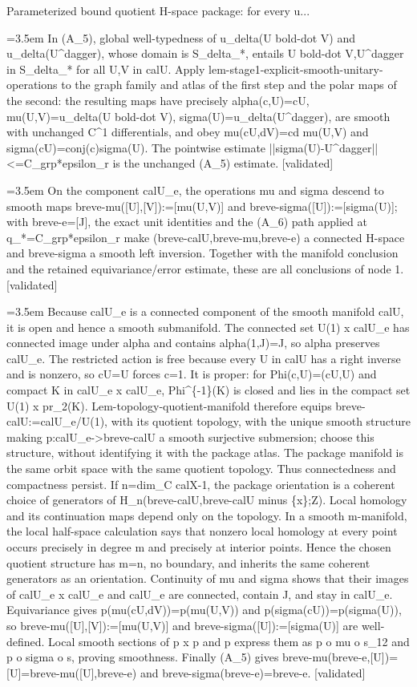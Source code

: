 \documentclass{article}
\newcommand{\step}[1]{\par\noindent\hangindent=3.5em\hangafter=1%
  \makebox[3.5em][l]{\textbf{#1.}}}
\newcommand{\steptag}[1]{\hfill{\small\textsf{[#1]}}}
\begin{document}
\begin{proofbox}{Parameterized bound quotient H-space package: for every u...}
\step{1.2.3} In (A\_5), global well-typedness of u\_delta(U bold-dot V) and u\_delta(U\textasciicircum{}dagger), whose domain is S\_delta\_*, entails U bold-dot V,U\textasciicircum{}dagger in S\_delta\_* for all U,V in calU. Apply lem-stage1-explicit-smooth-unitary-operations to the graph family and atlas of the first step and the polar maps of the second: the resulting maps have precisely alpha(c,U)=cU, mu(U,V)=u\_delta(U bold-dot V), sigma(U)=u\_delta(U\textasciicircum{}dagger), are smooth with unchanged C\textasciicircum{}1 differentials, and obey mu(cU,dV)=cd mu(U,V) and sigma(cU)=conj(c)sigma(U). The pointwise estimate ||sigma(U)-U\textasciicircum{}dagger||<=C\_grp*epsilon\_r is the unchanged (A\_5) estimate. \steptag{validated} \\[4pt]
\step{1.3} On the component calU\_e, the operations mu and sigma descend to smooth maps breve-mu([U],[V]):=[mu(U,V)] and breve-sigma([U]):=[sigma(U)]; with breve-e=[J], the exact unit identities and the (A\_6) path applied at q\_*=C\_grp*epsilon\_r make (breve-calU,breve-mu,breve-e) a connected H-space and breve-sigma a smooth left inversion. Together with the manifold conclusion and the retained equivariance/error estimate, these are all conclusions of node 1. \steptag{validated} \\[6pt]
\step{1.3.1} Because calU\_e is a connected component of the smooth manifold calU, it is open and hence a smooth submanifold. The connected set U(1) x calU\_e has connected image under alpha and contains alpha(1,J)=J, so alpha preserves calU\_e. The restricted action is free because every U in calU has a right inverse and is nonzero, so cU=U forces c=1. It is proper: for Phi(c,U)=(cU,U) and compact K in calU\_e x calU\_e, Phi\textasciicircum{}\{-1\}(K) is closed and lies in the compact set U(1) x pr\_2(K). Lem-topology-quotient-manifold therefore equips breve-calU:=calU\_e/U(1), with its quotient topology, with the unique smooth structure making p:calU\_e->breve-calU a smooth surjective submersion; choose this structure, without identifying it with the package atlas. The package manifold is the same orbit space with the same quotient topology. Thus connectedness and compactness persist. If n=dim\_C calX-1, the package orientation is a coherent choice of generators of H\_n(breve-calU,breve-calU minus \{x\};Z). Local homology and its continuation maps depend only on the topology. In a smooth m-manifold, the local half-space calculation says that nonzero local homology at every point occurs precisely in degree m and precisely at interior points. Hence the chosen quotient structure has m=n, no boundary, and inherits the same coherent generators as an orientation. Continuity of mu and sigma shows that their images of calU\_e x calU\_e and calU\_e are connected, contain J, and stay in calU\_e. Equivariance gives p(mu(cU,dV))=p(mu(U,V)) and p(sigma(cU))=p(sigma(U)), so breve-mu([U],[V]):=[mu(U,V)] and breve-sigma([U]):=[sigma(U)] are well-defined. Local smooth sections of p x p and p express them as p o mu o s\_12 and p o sigma o s, proving smoothness. Finally (A\_5) gives breve-mu(breve-e,[U])=[U]=breve-mu([U],breve-e) and breve-sigma(breve-e)=breve-e. \steptag{validated} \\[6pt]

\end{proofbox}
\end{document}
